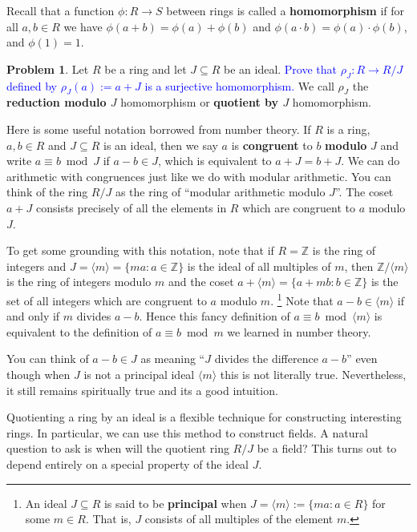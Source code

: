 \documentclass[11pt]{article}
\def\ZZ{\mathbb{Z}}
\theoremstyle{definition}
\newtheorem{problem}{Problem}[section]
\numberwithin{equation}{subsection}
\newcommand{\blue}[1]{\textcolor{blue}{#1}}
\begin{document}
Recall that a function $\phi : R \to S$ between rings is called a \textbf{homomorphism} if for all $a, b \in R$ we have $\phi(a + b) = \phi(a) + \phi(b)$ and $\phi(a\cdot b) = \phi(a)\cdot \phi(b)$, and $\phi(1) = 1$.

\begin{problem}
    Let $R$ be a ring and let $J \subseteq R$ be an ideal.
    \blue{Prove that $\rho_J : R \to R/J$ defined by $\rho_J(a) := a + J$ is a surjective homomorphism.}
    We call $\rho_J$ the \textbf{reduction modulo $J$} homomorphism or \textbf{quotient by $J$} homomorphism.
\end{problem}

Here is some useful notation borrowed from number theory.
If $R$ is a ring, $a, b \in R$ and $J \subseteq R$ is an ideal, then we say $a$ is \textbf{congruent} to $b$ \textbf{modulo} $J$ and write $a \equiv b \bmod J$ if $a - b \in J$, which is equivalent to $a + J = b + J$.
We can do arithmetic with congruences just like we do with modular arithmetic.
You can think of the ring $R/J$ as the ring of ``modular arithmetic modulo $J$''.
The coset $a + J$ consists precisely of all the elements in $R$ which are congruent to $a$ modulo $J$.

To get some grounding with this notation, note that if $R = \ZZ$ is the ring of integers and $J = \langle m \rangle = \{ma : a \in \ZZ\}$ is the ideal of all multiples of $m$, then $\ZZ/\langle m \rangle$ is the ring of integers modulo $m$ and the coset $a + \langle m\rangle = \{a + mb : b \in \ZZ\}$ is the set of all integers which are congruent to $a$ modulo $m$.
\footnote{An ideal $J \subseteq R$ is said to be \textbf{principal} when $J = \langle m\rangle := \{ma : a \in R\}$ for some $m \in R$.
That is, $J$ consists of all multiples of the element $m$.
}
Note that $a - b \in \langle m \rangle$ if and only if $m$ divides $a - b$.
Hence this fancy definition of $a \equiv b \bmod \langle m \rangle$ is equivalent to the definition of $a \equiv b \bmod m$ we learned in number theory.

You can think of $a - b \in J$ as meaning ``$J$ divides the difference $a - b$'' even though when $J$ is not a principal ideal $\langle m \rangle$ this is not literally true.
Nevertheless, it still remains spiritually true and its a good intuition.

Quotienting a ring by an ideal is a flexible technique for constructing interesting rings.
In particular, we can use this method to construct fields.
A natural question to ask is when will the quotient ring $R/J$ be a field?
This turns out to depend entirely on a special property of the ideal $J$.
\end{document}
